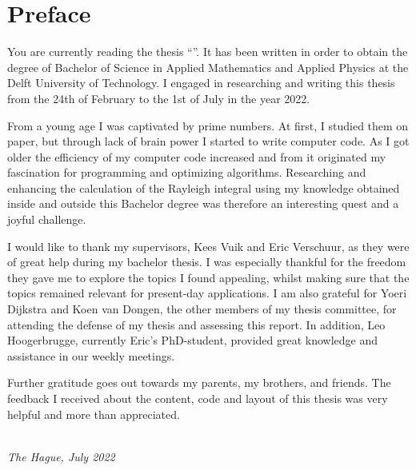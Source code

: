 \chapter*{Preface}

You are currently reading the thesis ``\makeatletter\@title\makeatother''. It has been written in order to obtain the degree of Bachelor of Science in Applied Mathematics and Applied Physics at the Delft University of Technology. I engaged in researching and writing this thesis from the 24th of February to the 1st of July in the year 2022.

From a young age I was captivated by prime numbers. At first, I studied them on paper, but through lack of brain power I started to write computer code. As I got older the efficiency of my computer code increased and from it originated my fascination for programming and optimizing algorithms.
Researching and enhancing the calculation of the Rayleigh integral using my knowledge obtained inside and outside this Bachelor degree was therefore an interesting quest and a joyful challenge.

I would like to thank my supervisors, Kees Vuik and Eric Verschuur, as they were of great help during my bachelor thesis. I was especially thankful for the freedom they gave me to explore the topics I found appealing, whilst making sure that the topics remained relevant for present-day applications.
I am also grateful for Yoeri Dijkstra and Koen van Dongen, the other members of my thesis committee, for attending the defense of my thesis and assessing this report.
In addition, Leo Hoogerbrugge, currently Eric's PhD-student, provided great knowledge and assistance in our weekly meetings.

Further gratitude goes out towards my parents, my brothers, and friends. The feedback I received about the content, code and layout of this thesis was very helpful and more than appreciated.

\begin{flushright}
{\makeatletter\itshape
    \@author \\
    The Hague, July 2022
\makeatother}
\end{flushright}

